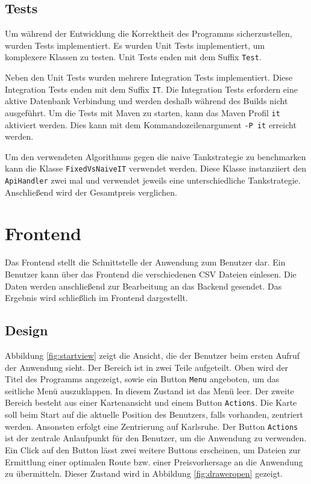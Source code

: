 \documentclass[
ngerman          %
,a4paper          %
,11pt
,pdftex
]{report}
\begin{document}
\subsection{Tests}

Um während der Entwicklung die Korrektheit des Programms sicherzustellen, wurden Tests implementiert. Es wurden Unit Tests implementiert, um komplexere Klassen zu testen. Unit Tests enden mit dem Suffix \texttt{Test}.

Neben den Unit Tests wurden mehrere Integration Tests implementiert. Diese Integration Tests enden mit dem Suffix \texttt{IT}. Die Integration Tests erfordern eine aktive Datenbank Verbindung und werden deshalb während des Builds nicht ausgeführt. Um die Tests mit Maven zu starten, kann das Maven Profil \texttt{it} aktiviert werden. Dies kann mit dem Kommandozeilenargument \texttt{-P it} erreicht werden.

Um den verwendeten Algorithmus gegen die naive Tankstrategie zu benchmarken kann die Klasse \texttt{FixedVsNaiveIT} verwendet werden. Diese Klasse instanziiert den \texttt{ApiHandler} zwei mal und verwendet jeweils eine unterschiedliche Tankstrategie. Anschließend wird der Gesamtpreis verglichen.

\newpage
\section{Frontend}

Das Frontend stellt die Schnittstelle der Anwendung zum Benutzer dar. Ein Benutzer kann über das Frontend die verschiedenen \ac{CSV} Dateien einlesen. Die Daten werden anschließend zur Bearbeitung an das Backend gesendet. Das Ergebnis wird schließlich im Frontend dargestellt.

\subsection{Design}

Abbildung \ref{fig:startview} zeigt die Ansicht, die der Benutzer beim ersten Aufruf der Anwendung sieht. Der Bereich ist in zwei Teile aufgeteilt. Oben wird der Titel des Programms angezeigt, sowie ein Button \texttt{Menu} angeboten, um das seitliche Menü auszuklappen. In diesem Zustand ist das Menü leer. Der zweite Bereich besteht aus einer Kartenansicht und einem Button \texttt{Actions}. Die Karte soll beim Start auf die aktuelle Position des Benutzers, falls vorhanden, zentriert werden. Ansonsten erfolgt eine Zentrierung auf Karlsruhe. Der Button \texttt{Actions} ist der zentrale Anlaufpunkt für den Benutzer, um die Anwendung zu verwenden. Ein Click auf den Button lässt zwei weitere Buttons erscheinen, um Dateien zur Ermittlung einer optimalen Route bzw. einer Preisvorhersage an die Anwendung zu übermitteln. Dieser Zustand wird in Abbildung \ref{fig:draweropen} gezeigt.
\end{document}
